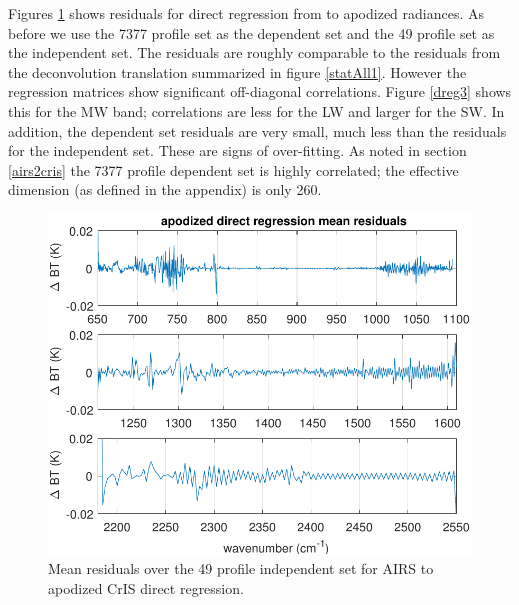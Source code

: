 \documentclass[journal]{IEEEtran}
\begin{document}
Figures \ref{dreg1} shows residuals for direct regression from
{\airs} to apodized {\cris} radiances.  As before we use the 7377
profile set as the dependent set and the 49 profile set as the
independent set.  The residuals are roughly comparable to the
residuals from the deconvolution translation summarized in figure
\ref{statAll1}.  However the regression matrices show significant
off-diagonal correlations.  Figure \ref{dreg3} shows this for the 
MW band; correlations are less for the LW and larger for the SW.  
In addition, the dependent set residuals are very small, much less
than the residuals for the independent set.  These are signs of
over-fitting.  As noted in section \ref{airs2cris} the 7377 profile
dependent set is highly correlated; the effective dimension (as
defined in the appendix) is only 260.


\begin{figure} %
  \centering
  \includegraphics[width=\linewidth]{figures/ap_dir_regr.pdf}
  \caption{Mean residuals over the 49 profile independent set for
    AIRS to apodized CrIS direct regression.}
  \label{dreg1}
\end{figure}
\end{document}
